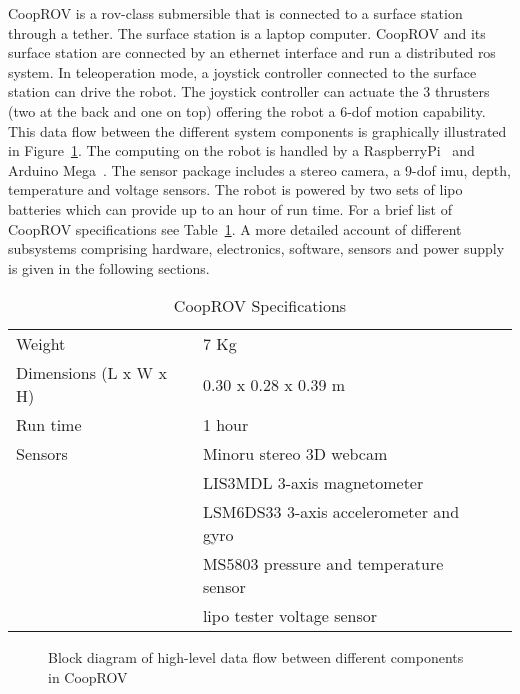 CoopROV is a \gls{rov}-class submersible that is connected to a surface station through a tether. The surface station is a laptop computer. CoopROV and its surface station are connected by an ethernet interface and run a distributed \gls{ros} system. In teleoperation mode, a joystick controller connected to the surface station can drive the robot. The joystick controller can actuate the 3 thrusters (two at the back and one on top) offering the robot a 6-\gls{dof} motion capability. This data flow between the different system components is graphically illustrated in Figure~\ref{fig:cooprov_dataflow}. The computing on the robot is handled by a RaspberryPi~\cite{raspberrypi} and Arduino Mega~\cite{arduino}. The sensor package includes a stereo camera, a 9-\gls{dof} \gls{imu}, depth, temperature and voltage sensors. The robot is powered by two sets of \gls{lipo} batteries which can provide up to an hour of run time. For a brief list of CoopROV specifications see Table~\ref{tab:cooprov_specs}. A more detailed 
account of 
different subsystems comprising hardware, electronics, software, sensors and power supply is given in the following sections.
%
\begin{table}	
  \begin{tabular}{lll} 
  \toprule
  Weight			&7 Kg\\
  Dimensions (L x W x H)	&0.30 x 0.28 x 0.39 m\\
  Run time			&1 hour\\
  Sensors			&Minoru stereo 3D webcam \\
				&LIS3MDL 3-axis magnetometer	\\
				&LSM6DS33 3-axis accelerometer and gyro\\
				&MS5803 pressure and temperature sensor\\
				&\gls{lipo} tester voltage sensor\\
  \bottomrule
  \end{tabular}
  \caption{CoopROV Specifications}
  \label{tab:cooprov_specs}
\end{table}
  
\begin{figure} 
  \centering
\caption[CoopROV data-flow diagram]{Block diagram of high-level data flow between different components in CoopROV}
\label{fig:cooprov_dataflow}
\end{figure}



